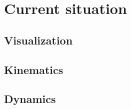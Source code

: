 \chapter{Current situation}

\section{Visualization}
\lipsum[1]

\section{Kinematics}
\lipsum[1]

\section{Dynamics}
\lipsum[1]
